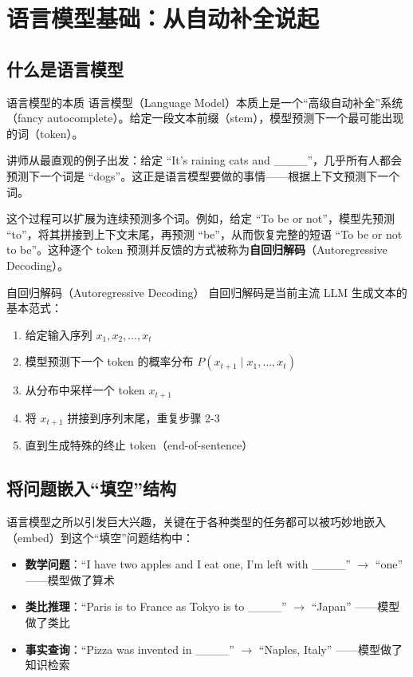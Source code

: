 \section{语言模型基础：从自动补全说起}

\subsection{什么是语言模型}

\begin{importantbox}{语言模型的本质}
语言模型（Language Model）本质上是一个``高级自动补全''系统（fancy autocomplete）。给定一段文本前缀（stem），模型预测下一个最可能出现的词（token）。
\end{importantbox}

讲师从最直观的例子出发：给定 ``It's raining cats and \_\_\_\_''，几乎所有人都会预测下一个词是 ``dogs''。这正是语言模型要做的事情——根据上下文预测下一个词。

这个过程可以扩展为连续预测多个词。例如，给定 ``To be or not''，模型先预测 ``to''，将其拼接到上下文末尾，再预测 ``be''，从而恢复完整的短语 ``To be or not to be''。这种逐个 token 预测并反馈的方式被称为\textbf{自回归解码}（Autoregressive Decoding）。

\begin{knowledgebox}{自回归解码（Autoregressive Decoding）}
自回归解码是当前主流 LLM 生成文本的基本范式：
\begin{enumerate}
    \item 给定输入序列 $x_1, x_2, \dots, x_t$
    \item 模型预测下一个 token 的概率分布 $P(x_{t+1} \mid x_1, \dots, x_t)$
    \item 从分布中采样一个 token $x_{t+1}$
    \item 将 $x_{t+1}$ 拼接到序列末尾，重复步骤 2-3
    \item 直到生成特殊的终止 token（end-of-sentence）
\end{enumerate}
\end{knowledgebox}

\subsection{将问题嵌入``填空''结构}

语言模型之所以引发巨大兴趣，关键在于各种类型的任务都可以被巧妙地嵌入（embed）到这个``填空''问题结构中：

\begin{itemize}
    \item \textbf{数学问题}：``I have two apples and I eat one, I'm left with \_\_\_\_'' $\rightarrow$ ``one'' ——模型做了算术
    \item \textbf{类比推理}：``Paris is to France as Tokyo is to \_\_\_\_'' $\rightarrow$ ``Japan'' ——模型做了类比
    \item \textbf{事实查询}：``Pizza was invented in \_\_\_\_'' $\rightarrow$ ``Naples, Italy'' ——模型做了知识检索
\end{itemize}

